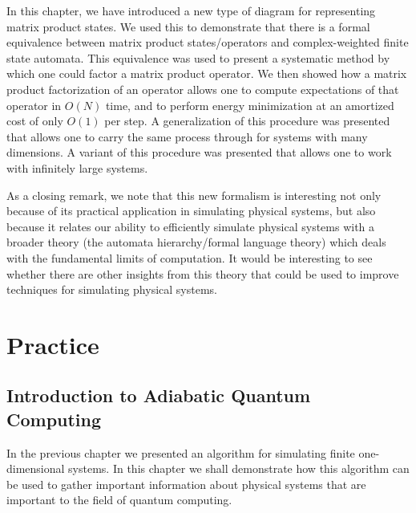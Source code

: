 \documentclass[12pt]{amsbook}
\theoremstyle{plain}
\theoremstyle{definition}
\theoremstyle{remark}
\begin{document}
In this chapter, we have introduced a new type of diagram for representing matrix product states.  We used this to demonstrate that there is a formal equivalence between matrix product states/operators and complex-weighted finite state automata.  This equivalence was used to present a systematic method by which one could factor a matrix product operator.  We then showed how a matrix product factorization of an operator allows one to compute expectations of that operator in $O(N)$ time, and to perform energy minimization at an amortized cost of only $O(1)$ per step.  A generalization of this procedure was presented that allows one to carry the same process through for systems with many dimensions.  A variant of this procedure was presented that allows one to work with infinitely large systems.

As a closing remark, we note that this new formalism is interesting not only because of its practical application in simulating physical systems, but also because it relates our ability to efficiently simulate physical systems with a broader theory (the automata hierarchy/formal language theory) which deals with the fundamental limits of computation.  It would be interesting to see whether there are other insights from this theory that could be used to improve techniques for simulating physical systems.
\chapter{Practice}
\label{sec:MPSPractice}
\section{Introduction to Adiabatic Quantum Computing}

In the previous chapter we presented an algorithm for simulating finite one-dimensional systems.  In this chapter we shall demonstrate how this algorithm can be used to gather important information about physical systems that are important to the field of quantum computing.
\end{document}
